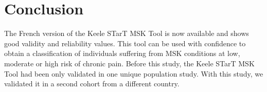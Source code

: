 \section{Conclusion}
The French version of the Keele STarT MSK Tool is now available and shows good validity and reliability values. This tool can be used with confidence to obtain a classification of individuals suffering from MSK conditions at low, moderate or high risk of chronic pain.  Before this study, the Keele STarT MSK Tool had been only validated in one unique population study. With this study, we validated it in a second cohort from a different country.  






